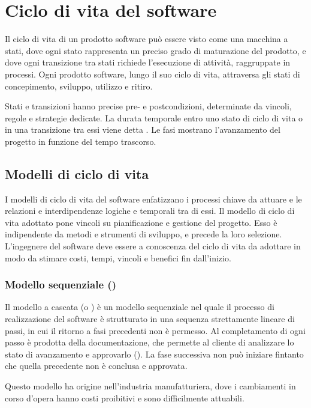 \section{Ciclo di vita del software}
Il ciclo di vita di un prodotto software può essere visto come una macchina a stati, dove ogni stato rappresenta un preciso grado di maturazione del prodotto, e dove ogni transizione tra stati richiede l'esecuzione di attività, raggruppate in processi. Ogni prodotto software, lungo il suo ciclo di vita, attraversa gli stati di concepimento, sviluppo, utilizzo e ritiro.

Stati e transizioni hanno precise pre- e postcondizioni, determinate da vincoli, regole e strategie dedicate. La durata temporale entro uno stato di ciclo di vita o in una transizione tra essi viene detta . Le fasi mostrano l'avanzamento del progetto in funzione del tempo trascorso.

\subsection{Modelli di ciclo di vita}
I modelli di ciclo di vita del software enfatizzano i processi chiave da attuare e le relazioni e interdipendenze logiche e temporali tra di essi. Il modello di ciclo di vita adottato pone vincoli su pianificazione e gestione del progetto. Esso è indipendente da metodi e strumenti di sviluppo, e precede la loro selezione. L'ingegnere del software deve essere a conoscenza del ciclo di vita da adottare in modo da stimare costi, tempi, vincoli e benefici fin dall'inizio.

\subsubsection{Modello sequenziale ()}
Il modello a cascata (o ) è un modello sequenziale nel quale il processo di realizzazione del software è strutturato in una sequenza strettamente lineare di passi, in cui il ritorno a fasi precedenti non è permesso. Al completamento di ogni passo è prodotta della documentazione, che permette al cliente di analizzare lo stato di avanzamento e approvarlo (). La fase successiva non può iniziare fintanto che quella precedente non è conclusa e approvata.

Questo modello ha origine nell'industria manufatturiera, dove i cambiamenti in corso d'opera hanno costi proibitivi e sono difficilmente attuabili.


